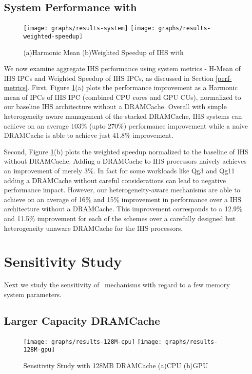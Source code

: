 \subsection{System Performance with \cachename}
\begin{figure}[!htb]
	\centering
	\texttt{[image: graphs/results-system]}
	\texttt{[image: graphs/results-weighted-speedup]}
	\caption{(a)Harmonic Mean (b)Weighted Speedup of IHS with \cachename}
	\label{results-system}
\end{figure}
\par We now examine aggregate IHS performance using system metrics - H-Mean of IHS IPCs and Weighted Speedup of IHS IPCs, as discussed in Section \ref{perf-metrics}. First, Figure \ref{results-system}(a) plots the performance improvement as a Harmonic mean of IPCs of IHS IPC (combined CPU cores and GPU CUs), normalized to our baseline IHS architecture without a DRAMCache. Overall with simple heterogeneity aware management of the stacked DRAMCache, IHS systems can achieve on an average 103\% (upto 270\%) performance improvement while a naive DRAMCache is able to achieve just 41.8\% improvement.
\par Second, Figure \ref{results-system}(b) plots the weighted speedup normalized to the baseline of IHS without DRAMCache. Adding a DRAMCache to IHS processors naively achieves an improvement of merely 3\%. In fact for some workloads like Qg3 and Qg11 adding a DRAMCache without careful considerations can lead to negative performance impact. However, our heterogeneity-aware mechanisms are able to achieve on an average of 16\% and 15\%  improvement in performance over a IHS architecture without a DRAMCache. This improvement corresponds to a 12.9\% and 11.5\% improvement for each of the schemes over a carefully designed but heterogeneity unaware DRAMCache for the IHS processors.


\section{Sensitivity Study} \label{sensitivity-results}

Next we study the sensitivity of \cachename\ mechanisms with regard to a few memory system parameters.

\subsection{Larger Capacity DRAMCache}


\begin{figure}[!htb]
	\centering
	\texttt{[image: graphs/results-128M-cpu]}
	\texttt{[image: graphs/results-128M-gpu]}
	\caption{Sensitivity Study with 128MB DRAMCache (a)CPU (b)GPU}
	\label{results-128m}
\end{figure}

